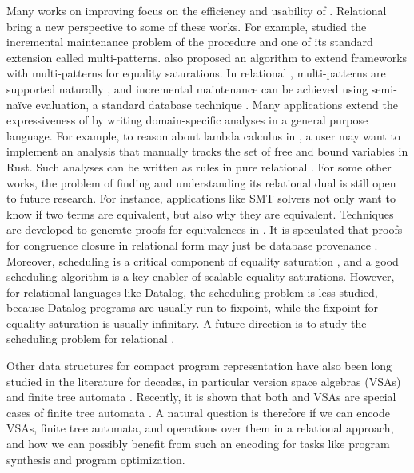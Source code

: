 Many works on improving \egraphs focus on the efficiency and usability of \egraphs.
Relational \egraphs bring a new perspective to some of these works.
For example, \citet{efficient-ematching} studied
 the incremental maintenance problem of the \ematching procedure
 and one of its standard extension called multi-patterns.
\citet{tensat} also proposed an algorithm 
 to extend \egraph frameworks with multi-patterns for equality saturations.
In relational \egraphs, multi-patterns are supported naturally \citep{relational-ematching},
 and incremental maintenance can be achieved using semi-na\"ive evaluation,
 a standard database technique \citep{datalog-survey}.
Many applications extend the expressiveness of \egraphs 
 by writing domain-specific analyses in a general purpose language.
For example, to reason about lambda calculus in \egg, 
 a user may want to implement an analysis that
 manually tracks the set of free and bound variables \citep{egg}
 in Rust.
Such analyses can be written as rules in pure relational \egraphs.
For some other works, 
 the problem of finding and understanding its relational dual 
 is still open to future research.
For instance,
 applications like SMT solvers not only want to know if two terms are equivalent, 
 but also why they are equivalent.
Techniques are developed to generate proofs for equivalences in \egraphs \citep{proof-producing}.
It is speculated that proofs for congruence closure in relational form 
 may just be database provenance \citep{prov-semiring,prov-souffle}.
Moreover,
 scheduling is a critical component of equality saturation \citep{egg}, 
 and a good scheduling algorithm is a key enabler of scalable equality saturations.
However, 
 for relational languages like Datalog,
 the scheduling problem is less studied,
 because Datalog programs are usually run to fixpoint,
 while the fixpoint for equality saturation is usually infinitary.
A future direction is to study the scheduling problem for relational \egraphs.

Other data structures for compact program representation 
 have also been long studied in the literature for decades,
 in particular version space algebras (VSAs) \citep{vsa,flashmeta} 
 and finite tree automata \citep{blaze, dace}.
Recently, it is shown that both \egraphs and VSAs are special cases of finite tree automata \citep{vsa-eq-fta}.
A natural question is therefore if we can encode 
 VSAs, finite tree automata, and operations over them in a relational approach,
 and how we can possibly benefit from such an encoding for tasks 
 like program synthesis and program optimization.

